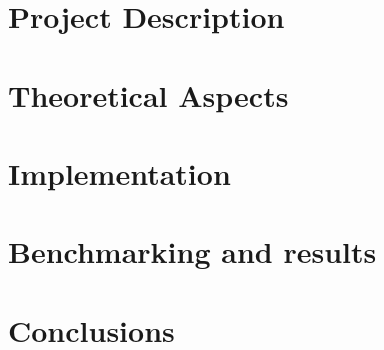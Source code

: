 \documentclass[10pt, a4paper]{report}
\begin{document}
\chapter{Project Description}
\thispagestyle{fancy}

\chapter{Theoretical Aspects}
\thispagestyle{fancy}

\chapter{Implementation}
\thispagestyle{fancy}

\chapter{Benchmarking and results}
\thispagestyle{fancy}

\chapter{Conclusions}
\thispagestyle{fancy}

\begin{printbibliography}
    \thispagestyle{fancy}
\end{printbibliography}

\begin{printnoidxglossaries}
    \thispagestyle{fancy}
\end{printnoidxglossaries}
\end{document}
